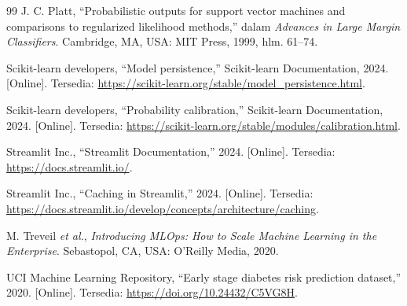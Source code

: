 \documentclass[a4paper,oneside,12pt]{report}
\begin{document}
\begin{thebibliography}{99}
	 J. C. Platt, ``Probabilistic outputs for support vector machines and comparisons to regularized likelihood methods,'' dalam \textit{Advances in Large Margin Classifiers}. Cambridge, MA, USA: MIT Press, 1999, hlm. 61--74.

	 Scikit-learn developers, ``Model persistence,'' Scikit-learn Documentation, 2024. [Online]. Tersedia: \url{https://scikit-learn.org/stable/model_persistence.html}.

	 Scikit-learn developers, ``Probability calibration,'' Scikit-learn Documentation, 2024. [Online]. Tersedia: \url{https://scikit-learn.org/stable/modules/calibration.html}.

	 Streamlit Inc., ``Streamlit Documentation,'' 2024. [Online]. Tersedia: \url{https://docs.streamlit.io/}.

	 Streamlit Inc., ``Caching in Streamlit,'' 2024. [Online]. Tersedia: \url{https://docs.streamlit.io/develop/concepts/architecture/caching}.

	 M. Treveil \textit{et al.}, \textit{Introducing MLOps: How to Scale Machine Learning in the Enterprise}. Sebastopol, CA, USA: O'Reilly Media, 2020.

	 UCI Machine Learning Repository, ``Early stage diabetes risk prediction dataset,'' 2020. [Online]. Tersedia: \url{https://doi.org/10.24432/C5VG8H}.
\end{thebibliography}
\end{document}
